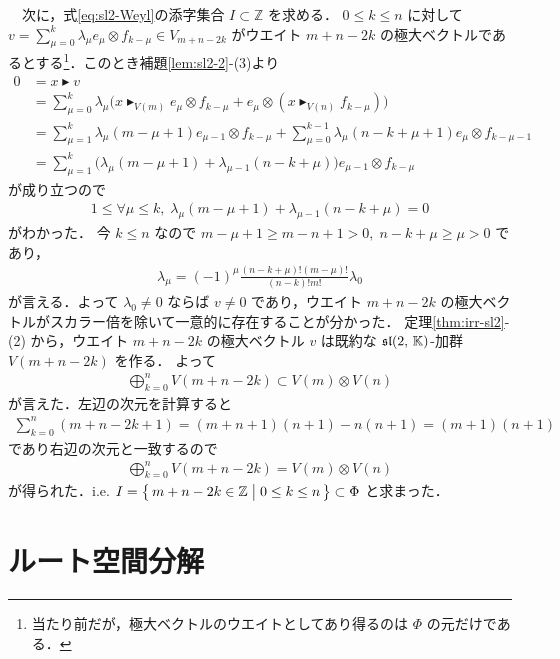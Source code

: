 \documentclass{ltjsarticle}
\theoremstyle{mystyle} %
\numberwithin{equation}{section}
\newcommand{\btr}{\blacktriangleright}
\begin{document}
　次に，式\eqref{eq:sl2-Weyl}の添字集合 $I \subset \mathbb{Z}$ を求める．
$0 \le k \le n$ に対して $v = \sum_{\mu=0}^k \lambda_\mu e_\mu \otimes f_{k - \mu} \in V_{m+n-2k}$ がウエイト $m+n-2k$ の極大ベクトルであるとする\footnote{当たり前だが，極大ベクトルのウエイトとしてあり得るのは $\Phi$ の元だけである．}．このとき補題\ref{lem:sl2-2}-(3)より
\begin{align}
    0 &= x \btr v \\
    &= \sum_{\mu=0}^k \lambda_\mu \bigl( x \btr_{V(m)} e_\mu \otimes f_{k-\mu} + e_\mu \otimes (x \btr_{V(n)} f_{k-\mu}) \bigr) \\
    &= \sum_{\mu=1}^k \lambda_\mu (m-\mu+1) e_{\mu-1} \otimes f_{k-\mu} + \sum_{\mu=0}^{k-1} \lambda_\mu (n-k+\mu+1) e_\mu \otimes f_{k-\mu-1} \\
    &= \sum_{\mu=1}^k \bigl( \lambda_\mu(m-\mu+1) + \lambda_{\mu-1}(n-k+\mu) \bigr) e_{\mu-1} \otimes f_{k-\mu}
\end{align}
が成り立つので
\begin{align}
    1 \le \forall \mu \le k,\; \lambda_\mu(m-\mu+1) + \lambda_{\mu-1}(n-k+\mu) = 0
\end{align}
がわかった．
今 $k \le n$ なので $m-\mu+1 \ge m-n+1 > 0,\; n-k+\mu \ge \mu > 0$ であり，
\begin{align}
    \lambda_\mu = (-1)^\mu \frac{(n-k+\mu)! (m-\mu)!}{(n-k)! m!} \lambda_0
\end{align}
が言える．よって $\lambda_0 \neq 0$ ならば $v \neq 0$ であり，ウエイト $m+n-2k$ の極大ベクトルがスカラー倍を除いて一意的に存在することが分かった．
定理\ref{thm:irr-sl2}-(2) から，ウエイト $m+n-2k$ の極大ベクトル $v$ は既約な $\mathfrak{sl}(2,\, \mathbb{K})$-加群 $V(m+n-2k)$ を作る．
よって
\begin{align}
    \bigoplus_{k=0}^n V(m+n-2k) \subset V(m) \otimes V(n)
\end{align}
が言えた．左辺の次元を計算すると
\begin{align}
    \sum_{k=0}^n (m+n-2k + 1) = (m+n+1)(n+1) - n(n+1) = (m+1)(n+1)
\end{align}
であり右辺の次元と一致するので
\begin{align}
    \bigoplus_{k=0}^n V(m+n-2k) = V(m) \otimes V(n)
\end{align}
が得られた．i.e. $I = \bigl\{\, m + n -2k \in \mathbb{Z} \bigm| 0 \le k \le n \,\bigr\} \subset \Phi$ と求まった．

\section{ルート空間分解}
\end{document}
